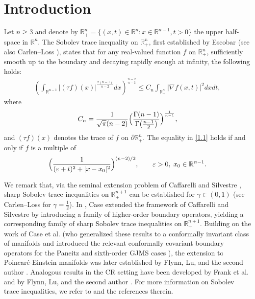 \documentclass[12pt,reqno]{amsart}%
\theoremstyle{plain}
\numberwithin{equation}{section}
\begin{document}
\maketitle





\section{Introduction}

Let \( n \geq 3 \) and denote by \(\mathbb{R}^{n}_{+} = \{ (x, t) \in \mathbb{R}^n : x \in \mathbb{R}^{n-1},  t > 0 \}\) the upper half-space in \(\mathbb{R}^n\).
The Sobolev trace inequality on \(\mathbb{R}^{n}_{+}\), first established by Escobar \cite{es} (see also Carlen--Loss \cite{Carlen}), states that for any real-valued function \(f\) on \(\mathbb{R}^{n}_{+}\), sufficiently smooth up to the boundary and decaying rapidly enough at infinity, the following holds:
\begin{align}\label{1.1}
\left( \int_{\mathbb{R}^{n-1}} |(\tau f)(x)|^{\frac{2(n-1)}{n-2}} dx\right)^{\frac{n-2}{n-1}}
\leq C_n \int_{\mathbb{R}^{n}_{+}} |\nabla f(x,t)|^2 dx dt,
\end{align}
where
\[
C_n = \frac{1}{\sqrt{\pi}(n-2)}
\Bigl( \frac{\Gamma(n-1)}{\Gamma\bigl(\frac{n-1}{2}\bigr)} \Bigr)^{\frac{1}{n-1}},
\]
and \((\tau f)(x)\) denotes the trace of \(f\) on \(\partial\mathbb{R}^{n}_{+}\).
The equality in \eqref{1.1} holds if and only if \(f\) is a multiple of
\[
\Bigl( \frac{1}{(\varepsilon + t)^2 + |x - x_0|^2} \Bigr)^{(n-2)/2}, \qquad
\varepsilon > 0, \; x_0 \in \mathbb{R}^{n-1}.
\]

We remark that, via the seminal extension problem of Caffarelli and Silvestre \cite{ca}, sharp Sobolev trace inequalities on \(\mathbb{R}^{n+1}_{+}\) can be established for \(\gamma \in (0,1)\) (see Carlen--Loss \cite{Carlen} for \(\gamma = \frac{1}{2}\)).
In \cite{Case2}, Case extended the framework of Caffarelli and Silvestre by introducing a family of higher-order boundary operators, yielding a corresponding family of sharp Sobolev trace inequalities on \(\mathbb{R}^{n+1}_{+}\).
Building on the work of Case et al. (who generalized these results to a conformally invariant class of manifolds and introduced the relevant conformally covariant boundary operators for the Paneitz and sixth-order GJMS cases \cite{Case0,Case1,Case&Luo}),   the extension to Poincar\'e-Einstein manifolds was later established by Flynn, Lu, and the second author \cite{Flynn&Lu&Yang}.
Analogous results in the CR setting have been developed by Frank et al. \cite{fr1} and by Flynn, Lu, and the second author \cite{Flynn&Lu&Yang1}.
For more information on Sobolev trace inequalities, we refer to \cite{Ache&Chang,be2,Case&Chang,Chen&Zhang,Gong,yang} and the references therein.
\end{document}
